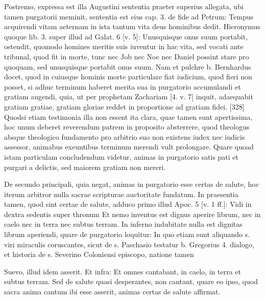Postremo, expressa est illa Augustini sententia praeter superius allegata, ubi tamen purgatorii meminit, sententia est eius cap. 3. de fide ad Petrum: Tempus acquirendi vitam aeternam in ista tantum vita deus hominibus dedit. Hieronymus quoque lib. 3. super illud ad Galat. 6 [v. 5]: Unusquisque onus suum portabit, ostendit, quomodo homines meritis suis iuventur in hac vita, sed vocati ante tribunal, quod fit in morte, tunc nec Job nec Noe nec Daniel possint stare pro quoquam, sed unusquisque portabit onus suum. Nam et pulchre b. Bernhardus docet, quod in cuiusque hominis morte particulare fiat iudicium, quod fieri non posset, si adhuc terminum haberet merita sua in purgatorio accumulandi et gratiam augendi, quia, ut per prophetam Zachariam [4. v. 7] inquit, adaequabit gratiam gratiae, gratiam gloriae reddet in proportione ad gratiam fidei. [328] Quodsi etiam testimonia illa non essent ita clara, quae tamen sunt apertissima, hoc unum deberet reverendum patrem in proposito absterrere, quod theologus absque theologico fundamento pro arbitrio suo non existens iudex nec iudicis assessor, animabus exeuntibus terminum merendi vult prolongare. Quare quoad istam particulam concludendum videtur, animas in purgatorio satis pati et purgari a delictis, sed maiorem gratiam non mereri.

De secundo principali, quia negat, animas in purgatorio esse certas de salute, hoc iterum arbitror nulla sacrae scripturae auctoritate fundatum. In praesentia tamen, quod sint certae de salute, adduco primo illud Apoc. 5 [v. 1 ff.]: Vidi in dextra sedentis super thronum Et nemo inventus est dignus aperire librum, nec in caelo nec in terra nec subtus terram. In inferno indubitate nulla est dignitas librum aperiendi, quare de purgatorio loquitur: In quo etiam sunt aliquando s. viri miraculis coruscantes, sicut de s. Paschasio testatur b. Gregorius 4. dialogo, et historia de s. Severino Coloniensi episcopo, natione tamen

Suevo, illud idem asserit. Et infra: Et omnes cantabant, in caelo, in terra et subtus terram. Sed de salute quasi desperantes, non cantant, quare eo ipso, quod sacra anima cantum ibi esse asserit, animas certas de salute affirmat.


